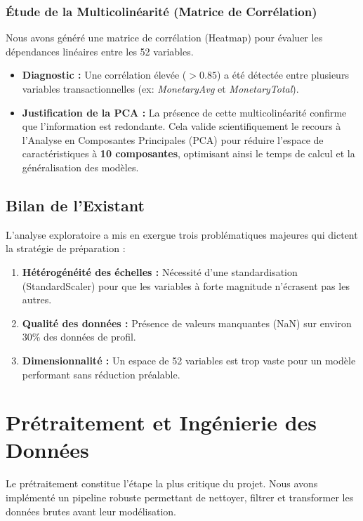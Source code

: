 \documentclass[11pt,a4paper]{article}
\begin{document}
\subsubsection{Étude de la Multicolinéarité (Matrice de Corrélation)}
Nous avons généré une matrice de corrélation (Heatmap) pour évaluer les dépendances linéaires entre les 52 variables.
\begin{itemize}
    \item \textbf{Diagnostic :} Une corrélation élevée ($> 0.85$) a été détectée entre plusieurs variables transactionnelles (ex: \textit{MonetaryAvg} et \textit{MonetaryTotal}). 
    \item \textbf{Justification de la PCA :} La présence de cette multicolinéarité confirme que l'information est redondante. Cela valide scientifiquement le recours à l'Analyse en Composantes Principales (PCA) pour réduire l'espace de caractéristiques à \textbf{10 composantes}, optimisant ainsi le temps de calcul et la généralisation des modèles.
\end{itemize}

\subsection{Bilan de l'Existant}
L'analyse exploratoire a mis en exergue trois problématiques majeures qui dictent la stratégie de préparation :
\begin{enumerate}
    \item \textbf{Hétérogénéité des échelles :} Nécessité d'une standardisation (StandardScaler) pour que les variables à forte magnitude n'écrasent pas les autres.
    \item \textbf{Qualité des données :} Présence de valeurs manquantes (NaN) sur environ 30\% des données de profil.
    \item \textbf{Dimensionnalité :} Un espace de 52 variables est trop vaste pour un modèle performant sans réduction préalable.
\end{enumerate}

\section{Prétraitement et Ingénierie des Données}

Le prétraitement constitue l'étape la plus critique du projet. Nous avons implémenté un pipeline robuste permettant de nettoyer, filtrer et transformer les données brutes avant leur modélisation.
\end{document}
